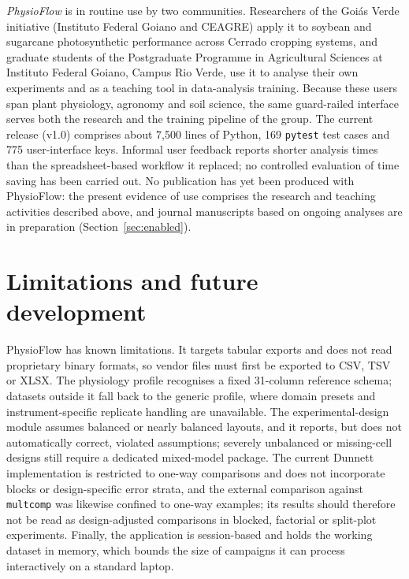 \documentclass[11pt, letterpaper]{article}
\begin{document}
\emph{PhysioFlow} is in routine use by two communities. Researchers of the Goi\'as Verde initiative (Instituto Federal Goiano and CEAGRE) apply it to soybean and sugarcane photosynthetic performance across Cerrado cropping systems, and graduate students of the Postgraduate Programme in Agricultural Sciences at Instituto Federal Goiano, Campus Rio Verde, use it to analyse their own experiments and as a teaching tool in data-analysis training. Because these users span plant physiology, agronomy and soil science, the same guard-railed interface serves both the research and the training pipeline of the group. The current release (v1.0) comprises about 7{,}500 lines of Python, 169 \texttt{pytest} test cases and 775 user-interface keys. Informal user feedback reports shorter analysis times than the spreadsheet-based workflow it replaced; no controlled evaluation of time saving has been carried out. No publication has yet been produced with PhysioFlow: the present evidence of use comprises the research and teaching activities described above, and journal manuscripts based on ongoing analyses are in preparation (Section~\ref{sec:enabled}).

\section{Limitations and future development}\label{sec:future}

PhysioFlow has known limitations. It targets tabular exports and does not read proprietary binary formats, so vendor files must first be exported to CSV, TSV or XLSX. The physiology profile recognises a fixed 31-column reference schema; datasets outside it fall back to the generic profile, where domain presets and instrument-specific replicate handling are unavailable. The experimental-design module assumes balanced or nearly balanced layouts, and it reports, but does not automatically correct, violated assumptions; severely unbalanced or missing-cell designs still require a dedicated mixed-model package. The current Dunnett implementation is restricted to one-way comparisons and does not incorporate blocks or design-specific error strata, and the external comparison against \texttt{multcomp} was likewise confined to one-way examples; its results should therefore not be read as design-adjusted comparisons in blocked, factorial or split-plot experiments. Finally, the application is session-based and holds the working dataset in memory, which bounds the size of campaigns it can process interactively on a standard laptop.
\end{document}
